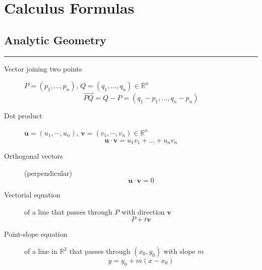 
\sloppy

\section*{Calculus Formulas}

\footnotesize
{}

\begin{multicols}{2}
\subsection*{Analytic Geometry}

	\begin{tcolorbox}[hbox, title=Vectors]
		\begin{minipage}{0.4\textwidth}
			\flushleft
			\rule{0.4\textwidth}{0pt}
			\begin{description}
				\item[Vector joining two points] $P=(p_1,\ldots,p_n)$, $Q=(q_1,\ldots,q_n)\in \mathbb{R}^n$
				      \[
					      \vec{PQ} = Q-P = (q_1-p_1,\ldots,q_n-p_n)
				      \]
				\item[Dot product] $\mathbf{u}=(u_1,\cdots,u_n)$, $\mathbf{v}=(v_1,\cdots,v_n)\in\mathbb{R}^n$
				      \[
					      \mathbf{u}\cdot \mathbf{v} = u_1v_1 + \ldots + u_nv_n
				      \]
				\item[Orthogonal vectors] (perpendicular)
				      \[
					      \mathbf{u\cdot v}=0
				      \]
			\end{description}
		\end{minipage}
	\end{tcolorbox}

	\begin{tcolorbox}[hbox, title=Lines]
		\begin{minipage}{0.4\textwidth}
			\flushleft
			\begin{description}
				\item[Vectorial equation] of a line that passes through $P$ with direction $\mathbf{v}$
				      \[
					      P+t\mathbf{v}
				      \]
				\item[Point-slope equation] of a line in $\mathbb{R}^2$ that passes through $(x_0,y_0)$ with slope $m$
				      \[
					      y=y_0+m(x-x_0)
				      \]
			\end{description}
		\end{minipage}
	\end{tcolorbox}


\end{multicols}
